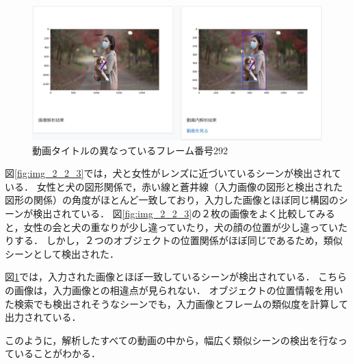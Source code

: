\documentclass[a4j,12pt,dvipdfmx]{jreport}
\begin{document}
\begin{figure}[H]
  \centering
  \includegraphics[width=13cm]{image/result2_2_4.jpg}
  \caption{動画タイトルの異なっているフレーム番号292}
  \label{fig:img_2_2_4}
\end{figure}

図\ref{fig:img_2_2_3}では，犬と女性がレンズに近づいているシーンが検出されている．
女性と犬の図形関係で，赤い線と蒼井線（入力画像の図形と検出された図形の関係）の角度がほとんど一致しており，入力した画像とほぼ同じ構図のシーンが検出されている．
図\ref{fig:img_2_2_3}の２枚の画像をよく比較してみると，女性の会と犬の重なりが少し違っていたり，犬の顔の位置が少し違っていたりする．
しかし，２つのオブジェクトの位置関係がほぼ同じであるため，類似シーンとして検出された．

図\ref{fig:img_2_2_4}では，入力された画像とほぼ一致しているシーンが検出されている．
こちらの画像は，入力画像との相違点が見られない．
オブジェクトの位置情報を用いた検索でも検出されそうなシーンでも，入力画像とフレームの類似度を計算して出力されている．

このように，解析したすべての動画の中から，幅広く類似シーンの検出を行なっていることがわかる．
\end{document}
